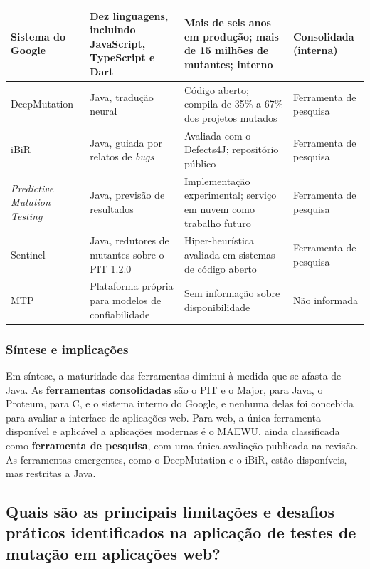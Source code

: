 \begin{longtable}{|p{2.7cm}|p{4.3cm}|p{4.3cm}|p{2.7cm}|}
    \hline
    Sistema do Google & Dez linguagens, incluindo JavaScript, TypeScript e Dart \cite{petrovic2021} & Mais de seis anos em produção; mais de 15 milhões de mutantes; interno & Consolidada (interna) \\
    \hline
    DeepMutation & Java, tradução neural \cite{tufano2020} & Código aberto; compila de 35\% a 67\% dos projetos mutados & Ferramenta de pesquisa \\
    \hline
    iBiR & Java, guiada por relatos de \textit{bugs} \cite{khanfir2023} & Avaliada com o Defects4J; repositório público & Ferramenta de pesquisa \\
    \hline
    \textit{Predictive Mutation Testing} & Java, previsão de resultados \cite{zhang2019} & Implementação experimental; serviço em nuvem como trabalho futuro & Ferramenta de pesquisa \\
    \hline
    Sentinel & Java, redutores de mutantes sobre o PIT 1.2.0 \cite{guizzo2022} & Hiper-heurística avaliada em sistemas de código aberto & Ferramenta de pesquisa \\
    \hline
    MTP & Plataforma própria para modelos de confiabilidade \cite{dimov2010} & Sem informação sobre disponibilidade & Não informada \\
\end{longtable}
\endgroup

\subsubsection{Síntese e implicações}

Em síntese, a maturidade das ferramentas diminui à medida que se afasta de Java. As \textbf{ferramentas consolidadas} são o PIT e o Major, para Java, o Proteum, para C, e o sistema interno do Google, e nenhuma delas foi concebida para avaliar a interface de aplicações web. Para web, a única ferramenta disponível e aplicável a aplicações modernas é o MAEWU, ainda classificada como \textbf{ferramenta de pesquisa}, com uma única avaliação publicada na revisão. As ferramentas emergentes, como o DeepMutation e o iBiR, estão disponíveis, mas restritas a Java. 

\subsection[Principais limitações e desafios práticos]{Quais são as principais limitações e desafios práticos identificados na aplicação de testes de mutação em aplicações web?}
\label{subsec:limitacoes-desafios}

